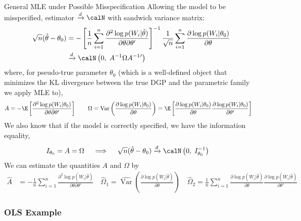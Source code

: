 \documentclass[aspectratio=169, handout]{beamer}
\newcommand{\Var}{\operatorname{Var}}
\newcommand{\dto}{\xrightarrow{d}}
\newcommand{\sumin}{\sum^n_{i=1}}
\begin{document}
{\scriptsize
\begin{frame}{General MLE under Possible Misspecification}
Allowing the model to be \alert{misspecified},
estimator $\dto \calN$ with sandwich variance matrix:
\begin{align*}
  \sqrt{n} (\hat{\theta}-\theta_0)
  &=
  -
  \left[
  \frac{1}{n}
  \sumin
  \frac{\partial^2 \log p(W_i|\tilde{\theta})}{\partial \theta\partial\theta'}
  \right]^{-1}
  \frac{1}{\sqrt{n}}
  \sumin
  \frac{\partial \log p(W_i|\theta_0)}{\partial \theta}
  \\
  &\dto
  \calN\left(
  0,\;
  A^{-1}
  \Omega
  A^{-1}{}'
  \right)
\end{align*}
where, for pseudo-true parameter $\theta_0$ (which is a well-defined
object that minimizes the KL divergence between the true DGP and
the parametric family we apply MLE to),
\begin{align*}
  A
  &=
  -
  \E\left[
  \frac{\partial^2 \log p(W_i|\theta_0)}{\partial \theta\partial\theta'}
  \right]
  \qquad
  \Omega
  =
  \Var\left(
    \frac{\partial \log p(W_i|\theta_0)}{\partial \theta}
  \right)
  =
  \E
  \left[
    \frac{\partial \log p(W_i|\theta_0)}{\partial \theta}
    \frac{\partial \log p(W_i|\theta_0)}{\partial \theta'}
  \right]
\end{align*}
We also know that if the model is correctly \alert{specified},
we have the information equality,
\begin{align*}
  I_{\theta_0}
  =
  A
  =
  \Omega
  \quad\implies\quad
  \sqrt{n} (\hat{\theta}-\theta_0)
  &\dto
  \calN\left(
  0,\;
  I_{\theta_0}^{-1}
  \right)
\end{align*}
We can estimate the quantities $A$ and $\Omega$ by
\begin{align*}
  \widehat{A}
  &=
  -
  \frac{1}{n}
  \sumin
  \frac{\partial^2 \log p(W_i|\hat{\theta})}{\partial \theta\partial\theta'}
  \quad
  \widehat{\Omega}_1
  =
  \widehat{\Var}\left(
    \frac{\partial \log p(W_i|\hat{\theta})}{\partial \theta}
  \right)
  \quad
  \widehat{\Omega}_2
  =
  \frac{1}{n}
  \sumin
  \frac{\partial \log p(W_i|\hat{\theta})}{\partial \theta}
  \frac{\partial \log p(W_i|\hat{\theta})}{\partial \theta'}
\end{align*}
\end{frame}
}


\subsubsection{OLS Example}
\end{document}
